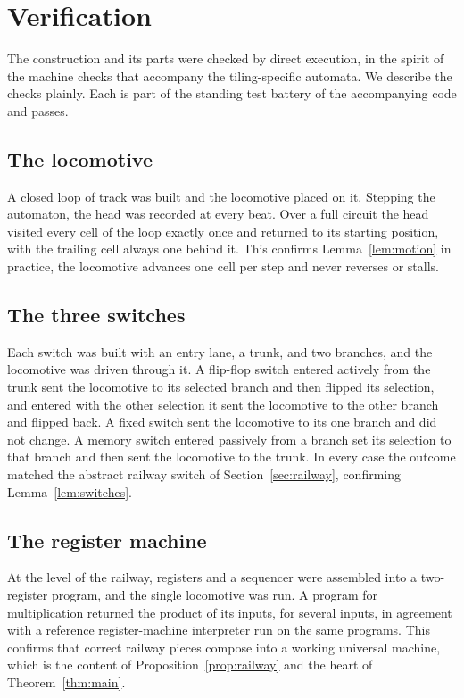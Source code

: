 \section{Verification}
\label{sec:verification}

The construction and its parts were checked by direct execution, in the spirit of the machine checks that
accompany the tiling-specific automata. We describe the checks plainly. Each is part of the standing test
battery of the accompanying code \cite{pollard2026vibe} and passes.

\subsection{The locomotive}

A closed loop of track was built and the locomotive placed on it. Stepping the automaton, the head was recorded
at every beat. Over a full circuit the head visited every cell of the loop exactly once and returned to its
starting position, with the trailing cell always one behind it. This confirms Lemma~\ref{lem:motion} in
practice, the locomotive advances one cell per step and never reverses or stalls.

\subsection{The three switches}

Each switch was built with an entry lane, a trunk, and two branches, and the locomotive was driven through it.
A flip-flop switch entered actively from the trunk sent the locomotive to its selected branch and then flipped
its selection, and entered with the other selection it sent the locomotive to the other branch and flipped
back. A fixed switch sent the locomotive to its one branch and did not change. A memory switch entered passively
from a branch set its selection to that branch and then sent the locomotive to the trunk. In every case the
outcome matched the abstract railway switch of Section~\ref{sec:railway}, confirming Lemma~\ref{lem:switches}.

\subsection{The register machine}

At the level of the railway, registers and a sequencer were assembled into a two-register program, and the
single locomotive was run. A program for multiplication returned the product of its inputs, for several inputs,
in agreement with a reference register-machine interpreter run on the same programs. This confirms that correct
railway pieces compose into a working universal machine, which is the content of Proposition~\ref{prop:railway}
and the heart of Theorem~\ref{thm:main}.


